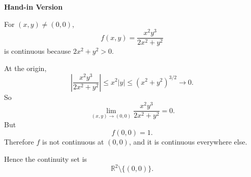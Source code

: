 \documentclass[a4paper,12pt,twocolumn]{article}
\newenvironment{solutionbox}{\begin{framed}}{\end{framed}}
\begin{document}
\begin{solutionbox}
\textbf{Hand-in Version}

For \((x,y)\ne(0,0)\),
\[
f(x,y)=\frac{x^2y^3}{2x^2+y^2}
\]
is continuous because \(2x^2+y^2>0\).

At the origin,
\[
\left|\frac{x^2y^3}{2x^2+y^2}\right|
\le x^2|y|
\le (x^2+y^2)^{3/2}\to 0.
\]
So
\[
\lim_{(x,y)\to(0,0)} \frac{x^2y^3}{2x^2+y^2}=0.
\]
But
\[
f(0,0)=1.
\]
Therefore \(f\) is not continuous at \((0,0)\), and it is continuous everywhere else.

Hence the continuity set is
\[
\boxed{\mathbb{R}^2\setminus\{(0,0)\}.}
\]
\end{solutionbox}
\end{document}
